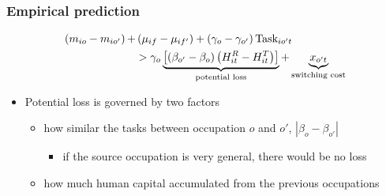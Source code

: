 \documentclass[11pt]{beamer}
\begin{document}
\begin{frame}
	\frametitle{Empirical prediction}
	
\begin{align}	\label{eq:eq10}
	\left(m_{io}-m_{io'} \right) + &\left( \mu_{if}-\mu_{if'}\right)+\left( \gamma_o-\gamma_{o'}\right) \text{Task}_{io't} \\
	&>\gamma_o\underbrace{\left[ \left( \beta_{o'} - \beta_{o}\right) \left( H_{it}^R-H_{it}^T\right) \right]}_{\text{potential loss}} +  \underbrace{x_{o't}}_{\text{switching cost}} \notag
\end{align}
	
	\begin{itemize}
		\item Potential loss is governed by two factors
		\begin{itemize}
			\item how similar the tasks between occupation $o$ and $o'$, $|\beta_o-\beta_{o'}|$
			\begin{itemize}
				\item if the source occupation is very general, there would be no loss
			\end{itemize}
			\item how much human capital accumulated from the previous occupations
		\end{itemize}
	
	\end{itemize}
\end{frame}
\end{document}

